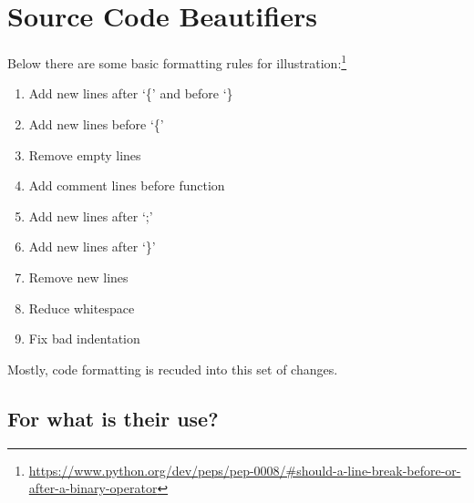 

%


\label{source_code_beautifiers}
\chapter{Source Code Beautifiers}


    Below there are some basic formatting rules for
    illustration:\footnote{\url{https://www.python.org/dev/peps/pep-0008/#should-a-line-break-before-or-after-a-binary-operator}}

    \medskip
    \begin{enumerate}
        \item Add new lines after `\{' and before `\}
        \item Add new lines before `\{'
        \item Remove empty lines
        \item Add comment lines before function
        \item Add new lines after `;'
        \item Add new lines after `\}'
        \item Remove new lines
        \item Reduce whitespace
        \item Fix bad indentation
    \end{enumerate}
    \vspace{-4mm}\begin{flushright}\textcite{prettyPrinter}\end{flushright}

    Mostly,
    code formatting is recuded into this set of changes.



    \section{For what is their use?}

